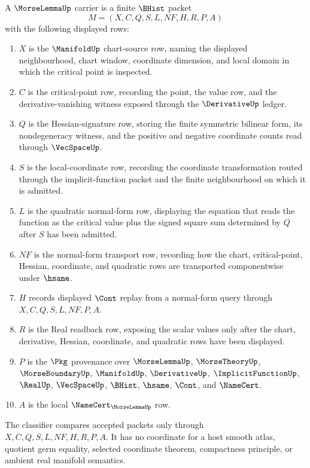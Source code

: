 \begin{definition}
\label{def:morse-lemma-namecert-carrier}
A $\MorseLemmaUp$ carrier is a finite $\BHist$ packet
$$
M=(X,C,Q,S,L,NF,H,R,P,A)
$$
with the following displayed rows:
\begin{enumerate}
\item $X$ is the $\ManifoldUp$ chart-source row, naming the displayed neighbourhood, chart window, coordinate dimension, and local domain in which the critical point is inspected.
\item $C$ is the critical-point row, recording the point, the value row, and the derivative-vanishing witness exposed through the $\DerivativeUp$ ledger.
\item $Q$ is the Hessian-signature row, storing the finite symmetric bilinear form, its nondegeneracy witness, and the positive and negative coordinate counts read through $\VecSpaceUp$.
\item $S$ is the local-coordinate row, recording the coordinate transformation routed through the implicit-function packet and the finite neighbourhood on which it is admitted.
\item $L$ is the quadratic normal-form row, displaying the equation that reads the function as the critical value plus the signed square sum determined by $Q$ after $S$ has been admitted.
\item $NF$ is the normal-form transport row, recording how the chart, critical-point, Hessian, coordinate, and quadratic rows are transported componentwise under $\hsame$.
\item $H$ records displayed $\Cont$ replay from a normal-form query through $X,C,Q,S,L,NF,P,A$.
\item $R$ is the Real readback row, exposing the scalar values only after the chart, derivative, Hessian, coordinate, and quadratic rows have been displayed.
\item $P$ is the $\Pkg$ provenance over $\MorseLemmaUp$, $\MorseTheoryUp$, $\MorseBoundaryUp$, $\ManifoldUp$, $\DerivativeUp$, $\ImplicitFunctionUp$, $\RealUp$, $\VecSpaceUp$, $\BHist$, $\hsame$, $\Cont$, and $\NameCert$.
\item $A$ is the local $\NameCert_{\MorseLemmaUp}$ row.
\end{enumerate}
The classifier compares accepted packets only through $X,C,Q,S,L,NF,H,R,P,A$. It has no coordinate for a host smooth atlas, quotient germ equality, selected coordinate theorem, compactness principle, or ambient real manifold semantics.
\end{definition}

